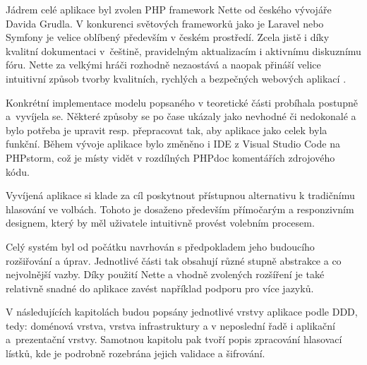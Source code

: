 

\label{section:pozadavkyCele}


Jádrem celé aplikace byl zvolen PHP framework Nette od českého vývojáře Davida Grudla. 
V konkurenci světových frameworků jako je Laravel nebo Symfony je velice oblíbený především v českém prostředí. Zcela jistě i díky kvalitní dokumentaci v~češtině, pravidelným aktualizacím i aktivnímu diskuznímu fóru. 
Nette za velkými hráči rozhodně nezaostává a naopak přináší velice intuitivní způsob tvorby kvalitních, rychlých a bezpečných webových aplikací \cite{Haska2016}.




{}


{}\label{section:DDD}

\clearpage
{}\label{section:Entity}




Konkrétní implementace modelu popsaného v teoretické části probíhala postupně a~vyvíjela se. Některé způsoby se po čase ukázaly jako nevhodné či nedokonalé a bylo potřeba je upravit resp. přepracovat tak, aby aplikace jako celek byla funkční. Během vývoje aplikace bylo změněno i IDE z Visual Studio Code na PHPstorm, což je místy vidět v rozdílných PHPdoc komentářích zdrojového kódu.

\bigskip

Vyvíjená aplikace si klade za cíl poskytnout přístupnou alternativu k tradičnímu hlasování ve volbách. Tohoto je dosaženo především přímočarým a responzivním designem, který by měl uživatele intuitivně provést volebním procesem.

Celý systém byl od počátku navrhován s předpokladem jeho budoucího rozšiřování a úprav. Jednotlivé části tak obsahují různé stupně abstrakce a co nejvolnější vazby. Díky použití Nette a vhodně zvolených rozšíření je také relativně snadné do aplikace zavést například podporu pro více jazyků.

\bigskip

V následujících kapitolách budou popsány jednotlivé vrstvy aplikace podle DDD, tedy: doménová vrstva, vrstva infrastruktury a v neposlední řadě i aplikační a~prezentační vrstvy.  Samotnou kapitolu pak tvoří popis zpracování hlasovací lístků, kde je podrobně rozebrána jejich validace a šifrování.

